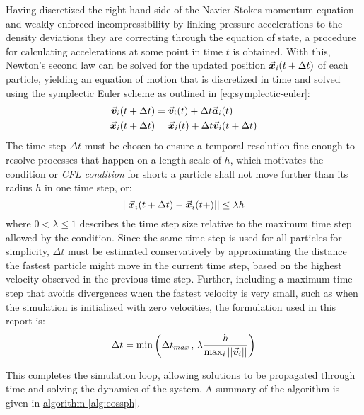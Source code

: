 Having discretized the right-hand side of the Navier-Stokes momentum equation and weakly enforced incompressibility by linking pressure accelerations to the density deviations they are correcting through the equation of state, a procedure for calculating accelerations at some point in time $t$ is obtained. With this, Newton's second law can be solved for the updated position $\vec{\bm{x}}_i(t+\Delta t)$ of each particle, yielding an equation of motion that is discretized in time and solved using the symplectic Euler scheme as outlined in \autoref{eq:symplectic-euler}:
\begin{align}
  \vec{\bm{v}}_i(t+\Delta t) & = \vec{\bm{v}}_i(t) + \Delta t \vec{\bm{a}}_i(t)          \\
  \vec{\bm{x}}_i(t+\Delta t) & = \vec{\bm{x}}_i(t) + \Delta t \vec{\bm{v}}_i(t+\Delta t)
\end{align}
The time step $\Delta t$ must be chosen to ensure a temporal resolution fine enough to resolve processes that happen on a length scale of $h$, which motivates the  condition or \textit{CFL condition} for short: a particle shall not move further than its radius $h$ in one time step, or:
\begin{equation}\label{eq:cfl-condition}
  \left|\left|\vec{\bm{x}}_i(t+\Delta t)-\vec{\bm{x}}_i(t+)\right|\right|\leq \lambda h
\end{equation}
where $0<\lambda\leq 1$ describes the time step size relative to the maximum time step allowed by the condition. Since the same time step is used for all particles for simplicity, $\Delta t$ must be estimated conservatively by approximating the distance the fastest particle might move in the current time step, based on the highest velocity observed in the previous time step. Further, including a maximum time step that avoids divergences when the fastest velocity is very small, such as when the simulation is initialized with zero velocities, the formulation used in this report is:
\begin{equation}\label{eq:update-dt}
  \Delta t = \min\left(\Delta t_{max}\,,\,\lambda \frac{h}{\max_i \left|\left|\vec{\bm{v}}_i\right|\right|}\right)
\end{equation}

This completes the simulation loop, allowing solutions to be propagated through time and solving the dynamics of the system. A summary of the algorithm is given in \hyperref[alg:eossph]{algorithm \ref{alg:eossph}}.


